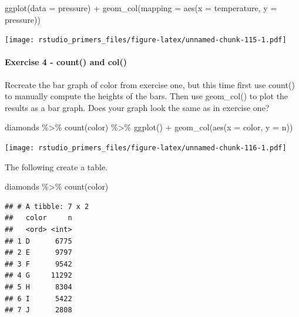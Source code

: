 \documentclass[
]{article}
\newenvironment{Shaded}{\begin{snugshade}}{\end{snugshade}}
\newcommand{\AttributeTok}[1]{\textcolor[rgb]{0.77,0.63,0.00}{#1}}
\newcommand{\FunctionTok}[1]{\textcolor[rgb]{0.00,0.00,0.00}{#1}}
\newcommand{\NormalTok}[1]{#1}
\newcommand{\SpecialCharTok}[1]{\textcolor[rgb]{0.00,0.00,0.00}{#1}}
\begin{document}
\begin{Shaded}
\begin{Highlighting}[]
\FunctionTok{ggplot}\NormalTok{(}\AttributeTok{data =}\NormalTok{ pressure) }\SpecialCharTok{+}
  \FunctionTok{geom\_col}\NormalTok{(}\AttributeTok{mapping =} \FunctionTok{aes}\NormalTok{(}\AttributeTok{x =}\NormalTok{ temperature, }\AttributeTok{y =}\NormalTok{ pressure))}
\end{Highlighting}
\end{Shaded}

\texttt{[image: rstudio\_primers\_files/figure-latex/unnamed-chunk-115-1.pdf]}

\hypertarget{exercise-4---count-and-col}{%
\paragraph{Exercise 4 - count() and
col()}\label{exercise-4---count-and-col}}

Recreate the bar graph of color from exercise one, but this time first
use count() to manually compute the heights of the bars. Then use
geom\_col() to plot the results as a bar graph. Does your graph look the
same as in exercise one?

\begin{Shaded}
\begin{Highlighting}[]
\NormalTok{diamonds }\SpecialCharTok{\%\textgreater{}\%} 
  \FunctionTok{count}\NormalTok{(color) }\SpecialCharTok{\%\textgreater{}\%}
  \FunctionTok{ggplot}\NormalTok{() }\SpecialCharTok{+}
  \FunctionTok{geom\_col}\NormalTok{(}\FunctionTok{aes}\NormalTok{(}\AttributeTok{x =}\NormalTok{ color, }\AttributeTok{y =}\NormalTok{ n))}
\end{Highlighting}
\end{Shaded}

\texttt{[image: rstudio\_primers\_files/figure-latex/unnamed-chunk-116-1.pdf]}

The following create a table.

\begin{Shaded}
\begin{Highlighting}[]
\NormalTok{diamonds }\SpecialCharTok{\%\textgreater{}\%} 
  \FunctionTok{count}\NormalTok{(color)}
\end{Highlighting}
\end{Shaded}

\begin{verbatim}
## # A tibble: 7 x 2
##   color     n
##   <ord> <int>
## 1 D      6775
## 2 E      9797
## 3 F      9542
## 4 G     11292
## 5 H      8304
## 6 I      5422
## 7 J      2808
\end{verbatim}
\end{document}
